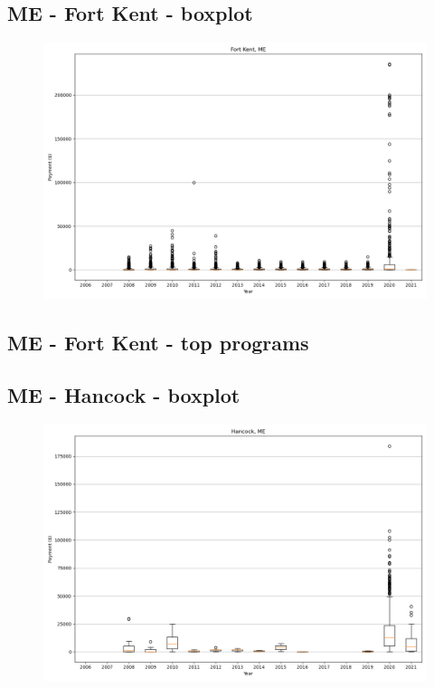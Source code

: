 \subsection*{ME - Fort Kent - boxplot}
\begin{figure}[h]
\centering
\includegraphics[width=7in]{../output/boxplots/counties/Fort Kent-ME_boxplot.png}
\end{figure}


\subsection*{ME - Fort Kent - top programs}

\newpage
\subsection*{ME - Hancock - boxplot}
\begin{figure}[h]
\centering
\includegraphics[width=7in]{../output/boxplots/counties/Hancock-ME_boxplot.png}
\end{figure}


